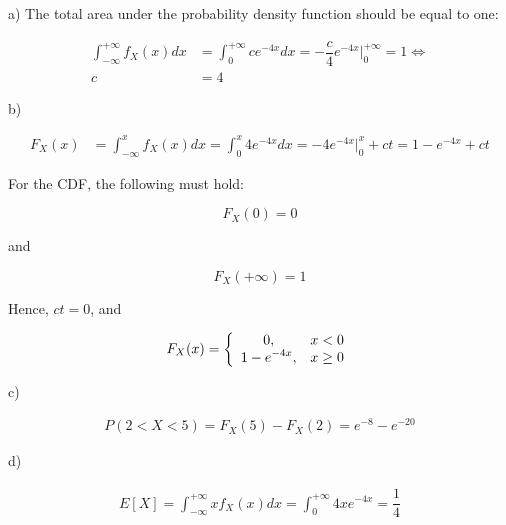 a) The total area under the probability density function should be equal to one:

\begin{align*}
  \int_{-\infty}^{+\infty} f_X(x)dx &= \int_{0}^{+\infty} ce^{-4x}dx = -\dfrac{c}{4} e^{-4x} \Big|_0^{+\infty} = 1 \Leftrightarrow \\
                                  c &= 4
\end{align*}


b)

\begin{align*}
  F_X(x) &= \int_{-\infty}^{x} f_X(x)dx = \int_{0}^{x} 4e^{-4x}dx = -4e^{-4x} \Big|_0^{x} + ct = 1 - e^{-4x} + ct
\end{align*}

For the CDF, the following must hold:

$$F_X(0) = 0$$

and

$$F_X(+\infty) = 1$$

Hence, $ct = 0$, and


\begin{align*}
  F_X(x) = \left\{
  \begin{array}{ c l }
  \displaystyle 0, & x < 0 \\
  \displaystyle 1 - e^{-4x}, & x \geq 0 \\
  \end{array}
  \right.
\end{align*}


c)

\begin{align*}
  P(2 < X < 5) = F_X(5) - F_X(2) = e^{-8} - e^{-20}
\end{align*}

d)

\begin{align*}
  E[X] = \int_{-\infty}^{+\infty} xf_X(x)dx = \int_{0}^{+\infty} 4xe^{-4x} = \dfrac{1}{4}
\end{align*}
